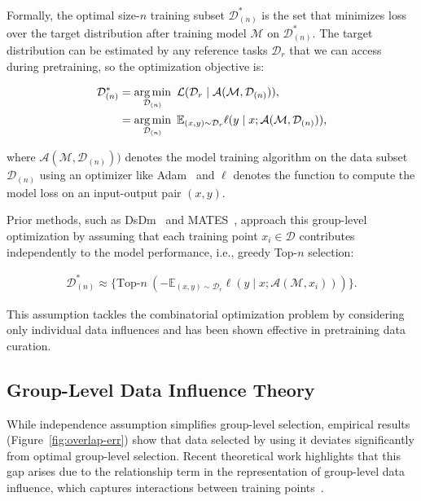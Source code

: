 Formally, the optimal size-$n$ training subset $\mathcal{D}^*_{(n)}$ is the set that minimizes loss over the target distribution after training model $\mathcal{M}$ on $\mathcal{D}^*_{(n)}$. The target distribution can be estimated by any reference tasks $\mathcal{D}_r$ that we can access during pretraining, so the optimization objective is:

\vspace{-0.85em}
\begin{align}
    \mathcal{D}^*_{(n)} &= \operatorname*{arg\,min}\limits_{\mathcal{D}_{(n)}}~\mathcal{L}(\mathcal{D}_r \mid \mathcal{A}(\mathcal{M}, \mathcal{D}_{(n)})), \\
    &= \operatorname*{arg\,min}\limits_{\mathcal{D}_{(n)}}~\mathbb{E}_{(x, y) \sim \mathcal{D}_r} \ell(y \mid x; \mathcal{A}(\mathcal{M}, \mathcal{D}_{(n)})),
\end{align}

where $\mathcal{A}(\mathcal{M}, \mathcal{D}_{(n)}))$ denotes the model training algorithm on the data subset $\mathcal{D}_{(n)}$ using an optimizer like Adam~\cite{KingBa15} and $\ell$ denotes the function to compute the model loss on an input-output pair $(x, y)$.

Prior methods, such as DsDm~\cite{engstrom2024dsdm} and MATES~\cite{yu2024mates}, approach this group-level optimization by assuming that each training point $x_i\in\mathcal{D}$ contributes independently to the model performance, i.e., greedy Top-$n$ selection:

\vspace{-0.85em}
\begin{align}
    \mathcal{D}^*_{(n)} \approx \{\text{Top-}n~(-\mathbb{E}_{(x, y) \sim \mathcal{D}_r} \ell(y \mid x; \mathcal{A}(\mathcal{M}, x_i)))\}.
\end{align}

This assumption tackles the combinatorial optimization problem by considering only individual data influences and has been shown effective in pretraining data curation.

\subsection{Group-Level Data Influence Theory}
\label{sec:connection}

While independence assumption simplifies group-level selection, empirical results (Figure~\ref{fig:overlap-err}) show that data selected by using it deviates significantly from optimal group-level selection. Recent theoretical work highlights that this gap arises due to the relationship term in the representation of group-level data influence, which captures interactions between training points~\cite{koh2019accuracy,wang2024capturing}.

